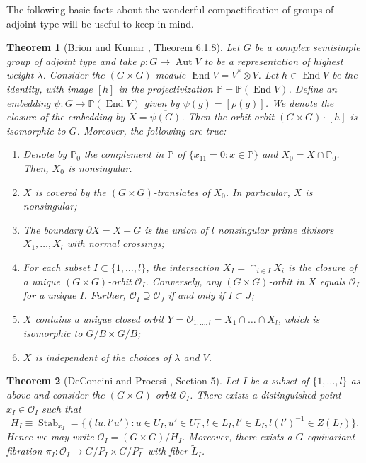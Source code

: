 \documentclass{amsart}
\newcommand{\Proj}{\mathbb{P}}
\DeclareMathOperator{\Aut}{Aut}
\DeclareMathOperator{\End}{End}
\DeclareMathOperator{\Stab}{Stab}
\newtheorem{theorem}{Theorem}[section]
\theoremstyle{definition}
\theoremstyle{remark}
\numberwithin{equation}{section}
\begin{document}
The following basic facts about the wonderful compactification of groups of adjoint type will be useful to keep in mind.

\begin{theorem}[Brion and Kumar \cite{FS}, Theorem 6.1.8]
Let $G$ be a complex semisimple group of adjoint type and take $\rho: G\to \Aut V$ to be a representation of highest weight $\lambda$. Consider the $(G\times G)$-module $\End V=V^*\otimes V$. Let $h\in\End V$ be the identity, with image $[h]$ in the projectivization $\Proj=\Proj(\End V)$.
Define an embedding $\psi: G\to\Proj(\End V)$ given by $\psi(g)=[\rho(g)]$. We denote the closure of the embedding by $X=\overline{\psi(G)}$. Then the orbit orbit $(G\times G)\cdot [h]$ is isomorphic to $G$. Moreover, the following are true:
\begin{enumerate}
    \item Denote by $\Proj_0$ the complement in $\Proj$ of $\{x_{11}=0: x\in\Proj\}$ and $X_0=X\cap\Proj_0$. Then, $X_0$ is nonsingular.
\item $X$ is covered by the $(G\times G)$-translates of $X_0$. In particular, $X$ is nonsingular;
\item The boundary $\partial X=X - G$ is the union of $l$ nonsingular prime divisors $X_1, \ldots, X_l$ with normal crossings; 
\item For each subset $I\subset \{1,\ldots, l\}$, the intersection $X_I=\cap_{i\in I}X_i$ is the closure of a unique $(G\times G)$-orbit $\mathcal{O}_I$. Conversely, any $(G\times G)$-orbit in $X$ equals $\mathcal{O}_I$ for a unique $I$. Further, $\overline{\mathcal{O}}_I\supseteq\mathcal{O}_J$ if and only if $I\subset J$;
\item $X$ contains a unique closed orbit $Y=\mathcal{O}_{1,\ldots, l}=X_1\cap\ldots\cap X_l$, which is isomorphic to $G/B\times G/B$;
\item $X$ is independent of the choices of $\lambda$ and $V$.
\end{enumerate}
\label{thm:props}
\end{theorem}

\begin{theorem}[DeConcini and Procesi \cite{CSV}, Section 5]
Let $I$ be a subset of $\{1,\ldots, l\}$ as above and consider the $(G\times G)$-orbit $\mathcal{O}_I$. There exists a distinguished point $x_I\in\mathcal{O}_I$ such that \[H_I\equiv \Stab_{x_I}=\{(lu,l'u'):u\in U_I,u'\in U_I^-,l\in L_I,l'\in L_I, l(l')^{-1}\in Z(L_I)\}.\]
Hence we may write $\mathcal{O}_I=(G\times G)/H_I$.
Moreover, there exists a $G$-equivariant fibration $\pi_I: \mathcal{O}_I\to G/P_I\times G/P_I^-$ with fiber $\tilde L_I$.
\label{thm:fib}
\end{theorem}
\end{document}
